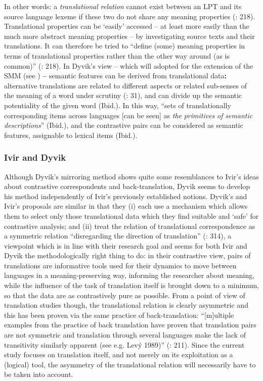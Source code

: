 In other words: a \textit{translational} \textit{relation} cannot exist between an LPT and its source language lexeme if these two do not share any meaning properties (\citealt{hasselgard_complexity_1999}: 218). Translational properties can be ‘easily’ accessed – at least more easily than the much more abstract meaning properties – by investigating source texts and their translations. It can therefore be tried to “define (some) meaning properties in terms of translational properties rather than the other way around (as is common)” (\citealt{hasselgard_complexity_1999}: 218). In Dyvik’s view – which will adopted for the extension of the SMM (see ) \textbf{–} semantic features can be derived from translational data\textbf{:} alternative translations are related to different aspects or related sub-senses of the meaning of a word under scrutiny (\citealt{langemets_translations_2005}: 31), and can divide up the semantic potentiality of the given word (Ibid.). In this way, “sets of translationally corresponding items across languages [can be seen] as \textit{the} \textit{primitives} \textit{of} \textit{semantic} \textit{descriptions}” (Ibid.), and the contrastive pairs can be considered as semantic features, assignable to lexical items (Ibid.).


\subsubsection{\label{sec:2.3.4.3}  Ivir and Dyvik} 

Although Dyvik’s mirroring method shows quite some resemblances to Ivir’s ideas about contrastive correspondents and back-translation, Dyvik seems to develop his method independently of Ivir’s previously established notions. Dyvik’s and Ivir’s proposals are similar in that they (i) each use a mechanism which allows them to select only those translational data which they find suitable and ‘safe’ for contrastive analysis; and (ii) treat the relation of translational correspondence as a symmetric relation “disregarding the direction of translation” (\citealt{aijmer_translations_2004}: 314), a viewpoint which is in line with their research goal and seems for both Ivir and Dyvik the methodologically right thing to do: in their contrastive view, pairs of translations are informative tools used for their dynamics to move between languages in a meaning-preserving way, informing the researcher about meaning, while the influence of the task of translation itself is brought down to a minimum, so that the data are as contrastively pure as possible. From a point of view of translation studies though, the translational relation is clearly asymmetric and this has been proven via the same practice of back-translation: “[m]ultiple examples from the practice of back translation have proven that translation pairs are not symmetric and translation through several languages make the lack of transitivity similarly apparent (see e.g. Levý 1989)” (\citealt{halverson_concept_1997}: 211). Since the current study focuses on translation itself, and not merely on its exploitation as a (logical) tool, the asymmetry of the translational relation will necessarily have to be taken into account.



